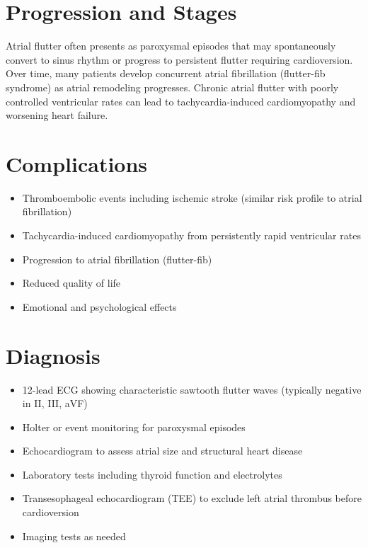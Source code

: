 \section{Progression and Stages}
Atrial flutter often presents as paroxysmal episodes that may spontaneously convert to sinus rhythm or progress to persistent flutter requiring cardioversion. Over time, many patients develop concurrent atrial fibrillation (flutter-fib syndrome) as atrial remodeling progresses. Chronic atrial flutter with poorly controlled ventricular rates can lead to tachycardia-induced cardiomyopathy and worsening heart failure.

\section{Complications}

\begin{itemize}[noitemsep]
  \item Thromboembolic events including ischemic stroke (similar risk profile to atrial fibrillation)
  \item Tachycardia-induced cardiomyopathy from persistently rapid ventricular rates
  \item Progression to atrial fibrillation (flutter-fib)
  \item Reduced quality of life
  \item Emotional and psychological effects
\end{itemize}

\section{Diagnosis}

\begin{itemize}[noitemsep]
  \item 12-lead ECG showing characteristic sawtooth flutter waves (typically negative in II, III, aVF)
  \item Holter or event monitoring for paroxysmal episodes
  \item Echocardiogram to assess atrial size and structural heart disease
  \item Laboratory tests including thyroid function and electrolytes
  \item Transesophageal echocardiogram (TEE) to exclude left atrial thrombus before cardioversion
  \item Imaging tests as needed
\end{itemize}

